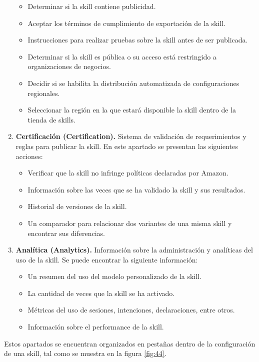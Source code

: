 \begin{enumerate}
\begin{itemize}
    \item Determinar si la skill contiene publicidad.
    \item Aceptar los términos de cumplimiento de exportación de la skill.
    \item Instrucciones para realizar pruebas sobre la skill antes de ser publicada.
    \item Determinar si la skill es pública o su acceso está restringido a organizaciones de negocios.
    \item Decidir si se habilita la distribución automatizada de configuraciones regionales.
    \item Seleccionar la región en la que estará disponible la skill dentro de la tienda de skills.
  \end{itemize}
  \item \textbf{Certificación (Certification).} Sistema de validación de requerimientos y reglas para publicar la skill. En este apartado se presentan las siguientes acciones:
  \begin{itemize}
    \item Verificar que la skill no infringe políticas declaradas por Amazon.
    \item Información sobre las veces que se ha validado la skill y sus resultados.
    \item Historial de versiones de la skill.
    \item Un comparador para relacionar dos variantes de una misma skill y encontrar sus diferencias.
  \end{itemize}
  \item \textbf{Analítica (Analytics).} Información sobre la administración y analíticas del uso de la skill. Se puede encontrar la siguiente información:
  \begin{itemize}
    \item Un resumen del uso del modelo personalizado de la skill.
    \item La cantidad de veces que la skill se ha activado.
    \item Métricas del uso de sesiones, intenciones, declaraciones, entre otros.
    \item Información sobre el performance de la skill.
  \end{itemize}
\end{enumerate}

Estos apartados se encuentran organizados en pestañas dentro de la configuración de una skill, tal como se muestra en la figura \ref{fig:44}.

